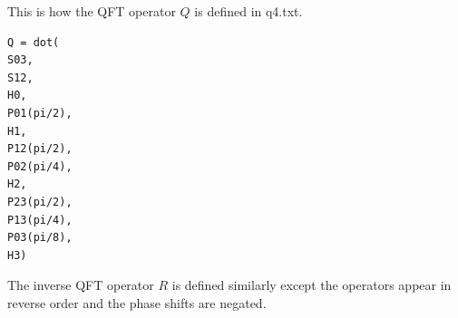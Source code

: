 \documentclass[12pt]{article}
\begin{document}
\noindent
This is how the QFT operator $Q$ is defined in q4.txt.

\begin{Verbatim}
Q = dot(
S03,
S12,
H0,
P01(pi/2),
H1,
P12(pi/2),
P02(pi/4),
H2,
P23(pi/2),
P13(pi/4),
P03(pi/8),
H3)
\end{Verbatim}

\noindent
The inverse QFT operator $R$ is defined similarly except the operators appear in reverse order
and the phase shifts are negated.
\end{document}
